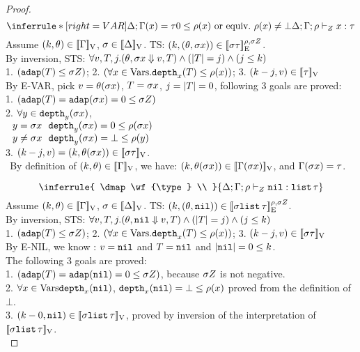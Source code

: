 \documentclass[a4paper,11pt]{article}
\theoremstyle{definition}
\begin{document}
\begin{proof}
\[    
	\inferrule*[right = VAR]{
      \Delta; \Gamma(x) = \type \\ 0 \leq \dmap(x) \mbox{ or equiv.\ } \dmap(x) \neq \bot
    }{
      \Delta; \Gamma; \dmap \tvdash{\nnatA} x: \type
    }
\]
Assume $(k, \theta) \in [\![ \Gamma ]\!]_{\text{V}}$, $ \sigma \in [\![ \Delta ]\!]_{\text{V}}$. TS: $(k, (\theta, \sigma x)) \in [\![ \sigma \tau ]\!]_{\text{E}}^{\rho, \sigma Z}$.\\
%
By inversion, STS: $\forall v, T, j. (\theta, \sigma x \mathrel{\Downarrow} v, T) \land (|T| = j) \land (j \leq k) $\\
%
1. $ (\mathtt{adap}(T) \leq \sigma Z)$;
%
2. $(\forall x \in \mbox{Vars}. \mathtt{depth}_{x}(T) \leq \rho(x))$;
%
3. $(k - j, v) \in [\![ \tau ]\!]_{\text{V}}$\\
%
By E-VAR, pick $v = \theta(\sigma x)$, $T = \sigma x$, $j = |T| = 0$, following 3 goals are proved:\\
%
1. $(\mathtt{adap}(T) = \mathtt{adap}(\sigma x) = 0 \leq \sigma Z)$\\
%
2. $\forall y \in \mathtt{depth}_{y}(\sigma x)$, \\
$~~ y = \sigma x ~~ \mathtt{depth}_{y}(\sigma x) = 0 \leq \rho(\sigma x)$\\
$~~ y \neq \sigma x ~~ \mathtt{depth}_{y}(\sigma x) = \bot \leq \rho(y)$\\
%
3. $(k - j, v) = (k, \theta(\sigma x)) \in [\![ \sigma \tau ]\!]_{\text{V}}$.\\
$~~$By definition of $(k, \theta) \in [\![ \Gamma ]\!]_{\text{V}}$, we have: $(k, \theta(\sigma x))\in [\![ \Gamma(\sigma x) ]\!]_{\text{V}}$, and $\Gamma(\sigma x) = \tau$. 


\[    
 \inferrule{
     \dmap \wf{\type} \\
    }{
      \Delta; \Gamma; \dmap \tvdash{\nnatA} \enil: \tlist{\type}
    }
\]
Assume $(k, \theta) \in [\![ \Gamma ]\!]_{\text{V}}$, $ \sigma \in [\![ \Delta ]\!]_{\text{V}}$. TS: $(k, (\theta, \mathtt{nil})) \in [\![ \sigma \mathtt{list} \, \tau ]\!]_{\text{E}}^{\rho, \sigma Z}$.\\
%
By inversion, STS: $\forall v, T, j. (\theta, \mathtt{nil} \mathrel{\Downarrow} v, T) \land (|T| = j) \land (j \leq k) $\\
%
1. $ (\mathtt{adap}(T) \leq \sigma Z)$;
%
2. $(\forall x \in \mbox{Vars}. \mathtt{depth}_{x}(T) \leq \rho(x))$;
%
3. $(k - j, v) \in [\![ \sigma \tau ]\!]_{\text{V}}$\\
%
By E-NIL, we know : $ v = \mathtt{nil} $ and $ T = \mathtt{nil}$ and $
|\mathtt{nil}| = 0 \leq k$. \\
The following 3 goals are proved:\\ 
%
1. $(\mathtt{adap}(T) = \mathtt{adap}(\mathtt{nil}) = 0 \leq \sigma Z)$, 
because $\sigma Z$ is not negative.\\
%
2. $\forall x \in \mbox{Vars} \mathtt{depth}_{x}(\mathtt{nil})$, 
$  \mathtt{depth}_{x}(\mathtt{nil}) = \bot \leq \rho(x)$ 
proved from the definition of $\bot$. \\
%
3. $(k - 0, \mathtt{nil}) \in [\![  \sigma \mathtt{list} \,  \tau  ]\!]_{\text{V}}$, 
proved by inversion of the interpretation of $[\![  \sigma \mathtt{list} \, \tau  ]\!]_{\text{V}} $.\\


\end{proof}
\end{document}
